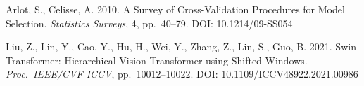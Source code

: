 \documentclass[9pt, a4paper, twocolumn]{article}
\begin{document}
\begin{sloppypar}
\begin{enumerate}[label={[\arabic*]}, leftmargin=*, itemsep=2pt, parsep=0pt, font=\small]
\item Arlot, S., Celisse, A. 2010. A Survey of Cross-Validation Procedures for Model Selection. \textit{Statistics Surveys}, 4, pp.~40--79. DOI: 10.1214/09-SS054

\item Liu, Z., Lin, Y., Cao, Y., Hu, H., Wei, Y., Zhang, Z., Lin, S., Guo, B. 2021. Swin Transformer: Hierarchical Vision Transformer using Shifted Windows. \textit{Proc.\ IEEE/CVF ICCV}, pp.~10012--10022. DOI: 10.1109/ICCV48922.2021.00986

\end{enumerate}
\end{sloppypar}
\end{document}
